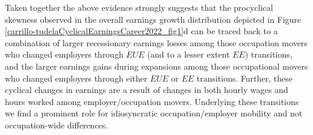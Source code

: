 \documentclass[12pt]{article}
\newcommand{\CiteReference}{../reference.bib}
\theoremstyle{definition}
\begin{document}
Taken together the above evidence strongly suggests that the procyclical skewness observed in the overall earnings growth distribution depicted in Figure \ref{carrillo-tudelaCyclicalEarningsCareer2022_fig1}d can be traced back to a combination of larger recessionary earnings losses among those occupation movers who changed employers through $EUE$ (and to a lesser extent $EE$) transitions, and the larger earnings gains during expansions among those occupational movers who changed employers through either $EUE$ or $EE$ transitions. Further, these cyclical changes in earnings are a result of changes in both hourly wages and hours worked among employer/occupation movers. Underlying these transitions we find a prominent role for idiosyncratic occupation/employer mobility and not occupation-wide differences.




 
\end{document}

